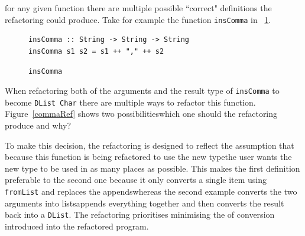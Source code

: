 
\DIFaddend for any given function there are multiple possible ``correct" definitions the refactoring could produce. Take for example the function \texttt{insComma} in \DIFdelbegin {}\DIFdelend \DIFaddbegin {}\DIFaddend ~\ref{insComma}.

\begin{figure}[t]
\begin{lstlisting}
insComma :: String -> String -> String
insComma s1 s2 = s1 ++ "," ++ s2
\end{lstlisting} 
\caption{\texttt{insComma}}
\label{insComma}
\end{figure} 

When refactoring both of the arguments and the result type of \texttt{insComma} to become \texttt{DList Char} there are multiple ways to refactor this function. Figure~\ref{commaRef} shows two possibilities\DIFdelbegin \DIFdel{, }\DIFdelend \DIFaddbegin \DIFadd{; }\DIFaddend which one should the refactoring produce and why?

To make this decision, the refactoring is designed to reflect the assumption that because this function is being refactored to use the new type\DIFaddbegin \DIFadd{, }\DIFaddend the user wants the new type to be used in as many places as possible. This makes the first definition preferable to the second one because it only converts a single item using \texttt{fromList} and replaces the appends\DIFaddbegin \DIFadd{, }\DIFaddend whereas the second example converts the two arguments into lists\DIFaddbegin \DIFadd{, }\DIFaddend appends everything together and then converts the result back into a \texttt{DList}. The refactoring prioritises minimising the \DIFdelbegin {}\DIFdelend \DIFaddbegin {}\DIFaddend of conversion introduced into the refactored program.  

